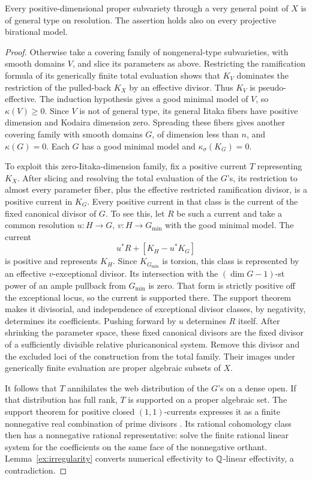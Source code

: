 \begin{proposition}\label{prop:general-type}
Every positive-dimensional proper subvariety through a very general
point of \(X\) is of general type on resolution. The assertion holds
also on every projective birational model.
\end{proposition}
\begin{proof}
Otherwise take a covering family of nongeneral-type subvarieties,
with smooth domains \(V\), and slice its parameters as above.
Restricting the ramification formula of its generically finite
total evaluation shows that \(K_V\) dominates the restriction of
the pulled-back \(K_X\) by an effective divisor. Thus \(K_V\) is
pseudo-effective. The induction hypothesis gives a good minimal
model of \(V\), so \(\kappa(V)\geq0\). Since \(V\) is not of general
type, its general Iitaka fibers have positive dimension and
Kodaira dimension zero. Spreading these fibers gives another
covering family with smooth domains \(G\), of dimension less than
\(n\), and \(\kappa(G)=0\). Each \(G\) has a good minimal model and
\(\kappa_\sigma(K_G)=0\).

To exploit this zero-Iitaka-dimension family, fix a positive current
\(T\) representing \(K_X\). After slicing and
resolving the total evaluation of the \(G\)'s, its restriction to
almost every parameter fiber, plus the effective restricted
ramification divisor, is a positive current in \(K_G\).
Every positive current in that class is the current of the fixed
canonical divisor of \(G\). To see this, let \(R\) be such a
current and take a common resolution
\(u:H\to G\), \(v:H\to G_{\min}\) with the good minimal model.
The current
\[
 u^*R+[K_H-u^*K_G]
\]
is positive and represents \(K_H\). Since \(K_{G_{\min}}\) is
torsion, this class is represented by an effective
\(v\)-exceptional divisor. Its intersection with the
\((\dim G-1)\)-st power of an ample pullback from \(G_{\min}\)
is zero. That form is strictly positive off the exceptional
locus, so the current is supported there. The support theorem
makes it divisorial, and independence of exceptional divisor
classes, by negativity, determines its coefficients. Pushing
forward by \(u\) determines \(R\) itself.
After shrinking the parameter space, these fixed canonical
divisors are the fixed divisor of a sufficiently divisible
relative pluricanonical system. Remove this divisor and the
excluded loci of the construction from the total family. Their
images under generically finite evaluation are proper algebraic
subsets of \(X\).

It follows that \(T\) annihilates the web distribution of the
\(G\)'s on a dense open. If that distribution has full rank, \(T\)
is supported on a proper algebraic set. The support theorem for
positive closed \((1,1)\)-currents expresses it as a finite
nonnegative real combination of prime divisors
\cite{Siu1974,Demailly2012}. Its rational cohomology class then has
a nonnegative rational representative: solve the finite rational
linear system for the coefficients on the same face of the
nonnegative orthant. Lemma~\ref{ex:irregularity} converts numerical
effectivity to \(\mathbb{Q}\)-linear effectivity, a contradiction.


\end{proof}
